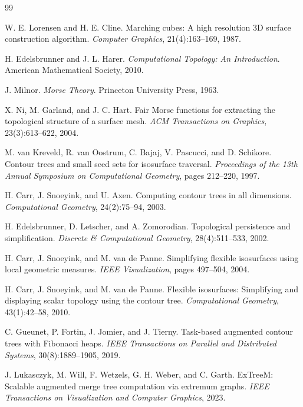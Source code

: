 \documentclass[twocolumn, a4paper, 10pt]{article}
\begin{document}
\clearpage
\begin{thebibliography}{99}


W. E. Lorensen and H. E. Cline.
Marching cubes: A high resolution 3D surface construction algorithm.
\textit{Computer Graphics}, 21(4):163--169, 1987.

H. Edelsbrunner and J. L. Harer.
\textit{Computational Topology: An Introduction}.
American Mathematical Society, 2010.

J. Milnor.
\textit{Morse Theory}.
Princeton University Press, 1963.

X. Ni, M. Garland, and J. C. Hart.
Fair Morse functions for extracting the topological structure of a surface mesh.
\textit{ACM Transactions on Graphics}, 23(3):613--622, 2004.


M. van Kreveld, R. van Oostrum, C. Bajaj, V. Pascucci, and D. Schikore.
Contour trees and small seed sets for isosurface traversal.
\textit{Proceedings of the 13th Annual Symposium on Computational Geometry}, pages 212--220, 1997.

H. Carr, J. Snoeyink, and U. Axen.
Computing contour trees in all dimensions.
\textit{Computational Geometry}, 24(2):75--94, 2003.

H. Edelsbrunner, D. Letscher, and A. Zomorodian.
Topological persistence and simplification.
\textit{Discrete \& Computational Geometry}, 28(4):511--533, 2002.

H. Carr, J. Snoeyink, and M. van de Panne.
Simplifying flexible isosurfaces using local geometric measures.
\textit{IEEE Visualization}, pages 497--504, 2004.

H. Carr, J. Snoeyink, and M. van de Panne.
Flexible isosurfaces: Simplifying and displaying scalar topology using the contour tree.
\textit{Computational Geometry}, 43(1):42--58, 2010.

C. Gueunet, P. Fortin, J. Jomier, and J. Tierny.
Task-based augmented contour trees with Fibonacci heaps.
\textit{IEEE Transactions on Parallel and Distributed Systems}, 30(8):1889--1905, 2019.

J. Lukasczyk, M. Will, F. Wetzels, G. H. Weber, and C. Garth.
ExTreeM: Scalable augmented merge tree computation via extremum graphs.
\textit{IEEE Transactions on Visualization and Computer Graphics}, 2023.


\end{thebibliography}
\end{document}
